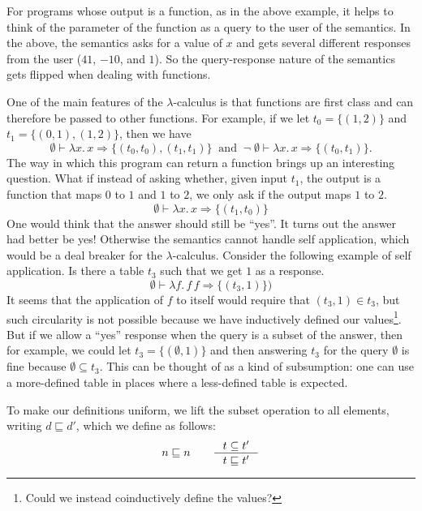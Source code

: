 \documentclass{tufte-handout}
\newcommand{\LAM}[1]{\lambda #1.\,}
\newcommand{\APP}[0]{\,}
\begin{document}
For programs whose output is a function, as in the above example, it
helps to think of the parameter of the function as a query to the user
of the semantics.  In the above, the semantics asks for a value of $x$
and gets several different responses from the user ($41$, $-10$, and
$1$). So the query-response nature of the semantics gets flipped when
dealing with functions.
%

One of the main features of the $\lambda$-calculus is that functions
are first class and can therefore be passed to other functions. For
example, if we let $t_0 = \{ (1,2) \}$ and $t_1
= \{ (0,1), (1,2) \}$, then we have
\[
  \emptyset \vdash \LAM{x} x \Rightarrow \{  (t_0, t_0), (t_1,t_1) \} 
  \;\;\text{and}\;\;
  \neg\; \emptyset \vdash \LAM{x} x \Rightarrow \{ (t_0, t_1) \}.
\]
The way in which this program can return a function brings up an
interesting question. What if instead of asking whether, given input
$t_1$, the output is a function that maps $0$ to $1$ and $1$ to $2$,
we only ask if the output maps $1$ to $2$.
\[
  \emptyset \vdash \LAM{x} x \Rightarrow
     \{  (t_1,t_0) \} 
\]
One would think that the answer should still be ``yes''.  It turns out
the answer had better be yes! Otherwise the semantics cannot handle
self application, which would be a deal breaker for the
$\lambda$-calculus. Consider the following example of self application.
Is there a table $t_3$ such that we get $1$ as a response.
\[
  \emptyset \vdash \LAM{f} f \APP f \Rightarrow
     \{ (t_3,1) \})
\]
It seems that the application of $f$ to itself would require that
$(t_3,1) \in t_3$, but such circularity is not possible because we
have inductively defined our values\footnote{Could we instead
  coinductively define the values?}.
%
But if we allow a ``yes'' response when the query is a subset of the
answer, then for example, we could let $t_3 = \{ (\emptyset,1) \}$ and
then answering $t_3$ for the query $\emptyset$ is fine because
$\emptyset \subseteq t_3$. This can be thought of as a kind of
subsumption: one can use a more-defined table in places where a
less-defined table is expected.

To make our definitions uniform, we lift the subset operation to all
elements, writing $d \sqsubseteq d'$, which we define as follows:
\[
    n \sqsubseteq n
    \qquad
    \inference{t \subseteq t'}{t \sqsubseteq t'}
\]
\end{document}
